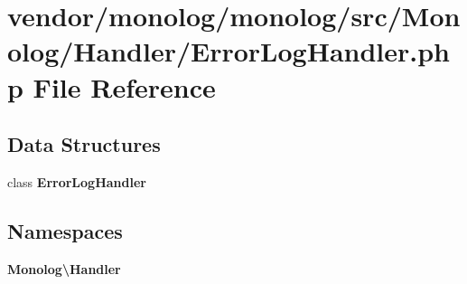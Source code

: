 \section{vendor/monolog/monolog/src/\+Monolog/\+Handler/\+Error\+Log\+Handler.php File Reference}
\label{_error_log_handler_8php}
\subsection*{Data Structures}
\begin{DoxyCompactItemize}
\item 
class {\bf Error\+Log\+Handler}
\end{DoxyCompactItemize}
\subsection*{Namespaces}
\begin{DoxyCompactItemize}
\item 
 {\bf Monolog\textbackslash{}\+Handler}
\end{DoxyCompactItemize}
